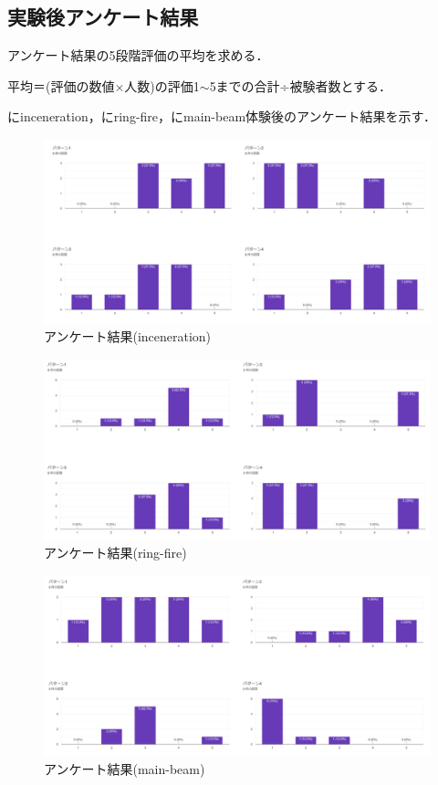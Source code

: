 \subsection{実験後アンケート結果}
アンケート結果の5段階評価の平均を求める．

平均＝(評価の数値×人数)の評価1$\sim$5までの合計÷被験者数とする．

にinceneration，にring-fire，にmain-beam体験後のアンケート結果を示す．

\begin{figure}[h]
  \centering
  \includegraphics[clip,width=14cm]{./fig/incenerationAnk.png}
  \caption{アンケート結果(inceneration)}\label{inceAnk}
  \end{figure}

\begin{figure}[h]
  \centering
  \includegraphics[clip,width=14cm]{fig/ringfireAnk.png}
  \caption{アンケート結果(ring-fire)}\label{ringAnk}
  \end{figure}

\newpage

\begin{figure}[h]
  \centering
  \includegraphics[clip,width=14cm]{fig/mainbeamAnk.png}
  \caption{アンケート結果(main-beam)}\label{mainAnk}
  \end{figure}
  



